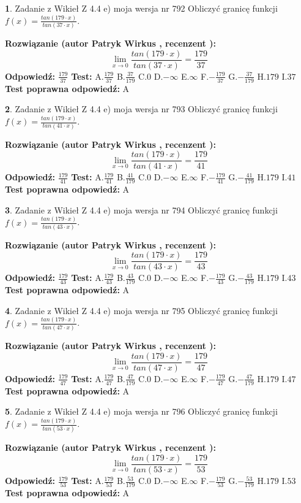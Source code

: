 \documentclass[12pt, a4paper]{article}
\theoremstyle{definition} %
\newtheorem{zad}{}
\newcommand{\zadStart}[1]{\begin{zad}#1\newline}
\newcommand{\zadStop}{\end{zad}}
\newcommand{\rozwStart}[2]{\noindent \textbf{Rozwiązanie (autor #1 , recenzent #2): }\newline}
\newcommand{\rozwStop}{\newline}
\newcommand{\odpStart}{\noindent \textbf{Odpowiedź:}\newline}
\newcommand{\odpStop}{\newline}
\newcommand{\testStart}{\noindent \textbf{Test:}\newline}
\newcommand{\testStop}{\newline}
\newcommand{\kluczStart}{\noindent \textbf{Test poprawna odpowiedź:}\newline}
\newcommand{\kluczStop}{\newline}
\begin{document}
\zadStart{Zadanie z Wikieł Z 4.4 e) moja wersja nr 792}
Obliczyć granicę funkcji $f(x)=\frac{tan(179\cdot x)}{tan(37\cdot x)}$.
\zadStop
\rozwStart{Patryk Wirkus}{}
$$\lim\limits_{x\to 0}\frac{tan(179\cdot x)}{tan(37\cdot x)}=
\frac{179}{37}$$
\rozwStop
\odpStart
$\frac{179}{37}$
\odpStop
\testStart
A.$\frac{179}{37}$
B.$\frac{37}{179}$
C.$0$
D.$-\infty$
E.$\infty$
F.$-\frac{179}{37}$
G.$-\frac{37}{179}$
H.$179$
I.$37$
\testStop
\kluczStart
A
\kluczStop



\zadStart{Zadanie z Wikieł Z 4.4 e) moja wersja nr 793}
Obliczyć granicę funkcji $f(x)=\frac{tan(179\cdot x)}{tan(41\cdot x)}$.
\zadStop
\rozwStart{Patryk Wirkus}{}
$$\lim\limits_{x\to 0}\frac{tan(179\cdot x)}{tan(41\cdot x)}=
\frac{179}{41}$$
\rozwStop
\odpStart
$\frac{179}{41}$
\odpStop
\testStart
A.$\frac{179}{41}$
B.$\frac{41}{179}$
C.$0$
D.$-\infty$
E.$\infty$
F.$-\frac{179}{41}$
G.$-\frac{41}{179}$
H.$179$
I.$41$
\testStop
\kluczStart
A
\kluczStop



\zadStart{Zadanie z Wikieł Z 4.4 e) moja wersja nr 794}
Obliczyć granicę funkcji $f(x)=\frac{tan(179\cdot x)}{tan(43\cdot x)}$.
\zadStop
\rozwStart{Patryk Wirkus}{}
$$\lim\limits_{x\to 0}\frac{tan(179\cdot x)}{tan(43\cdot x)}=
\frac{179}{43}$$
\rozwStop
\odpStart
$\frac{179}{43}$
\odpStop
\testStart
A.$\frac{179}{43}$
B.$\frac{43}{179}$
C.$0$
D.$-\infty$
E.$\infty$
F.$-\frac{179}{43}$
G.$-\frac{43}{179}$
H.$179$
I.$43$
\testStop
\kluczStart
A
\kluczStop



\zadStart{Zadanie z Wikieł Z 4.4 e) moja wersja nr 795}
Obliczyć granicę funkcji $f(x)=\frac{tan(179\cdot x)}{tan(47\cdot x)}$.
\zadStop
\rozwStart{Patryk Wirkus}{}
$$\lim\limits_{x\to 0}\frac{tan(179\cdot x)}{tan(47\cdot x)}=
\frac{179}{47}$$
\rozwStop
\odpStart
$\frac{179}{47}$
\odpStop
\testStart
A.$\frac{179}{47}$
B.$\frac{47}{179}$
C.$0$
D.$-\infty$
E.$\infty$
F.$-\frac{179}{47}$
G.$-\frac{47}{179}$
H.$179$
I.$47$
\testStop
\kluczStart
A
\kluczStop



\zadStart{Zadanie z Wikieł Z 4.4 e) moja wersja nr 796}
Obliczyć granicę funkcji $f(x)=\frac{tan(179\cdot x)}{tan(53\cdot x)}$.
\zadStop
\rozwStart{Patryk Wirkus}{}
$$\lim\limits_{x\to 0}\frac{tan(179\cdot x)}{tan(53\cdot x)}=
\frac{179}{53}$$
\rozwStop
\odpStart
$\frac{179}{53}$
\odpStop
\testStart
A.$\frac{179}{53}$
B.$\frac{53}{179}$
C.$0$
D.$-\infty$
E.$\infty$
F.$-\frac{179}{53}$
G.$-\frac{53}{179}$
H.$179$
I.$53$
\testStop
\kluczStart
A
\kluczStop
\end{document}
